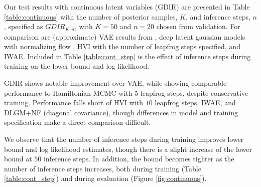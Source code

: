 \documentclass{article} %
\begin{document}
Our test results with continuous latent variables (GDIR) are presented in Table
\ref{table:continuous} with the number of posterior samples, $K$, and inference
steps, $n$, specified as $GDIR_{K, n}$, with $K=50$ and $n=20$ chosen from
validation. For comparison are (approximate) VAE results from
\citep{kingma2013auto}, deep latent gaussian models with normalizing flow
\citep[DLGM+NF,][]{rezende2015variational}, HVI with the number of leapfrog steps
specified, and IWAE. Included in Table \ref{table:cont_step} is
the effect of inference steps during training on the lower bound and log
likelihood.

GDIR shows notable improvement over VAE, while showing comparable performance to
Hamiltonian MCMC with 5 leapfrog steps, despite conservative training.
Performance falls short of HVI with $10$ leapfrog steps, IWAE, and DLGM+NF (diagonal covariance),
though differences in model and training specification make a direct comparison difficult.

We observe that the number of inference steps during training improves lower
bound and log likelihood estimates, though there is a slight increase of the lower bound at $50$ inference steps. In addition, the bound becomes tighter as the number of inference steps increases, both during training (Table \ref{table:cont_step}) and during evaluation (Figure \ref{fig:continuous}).
\end{document}
